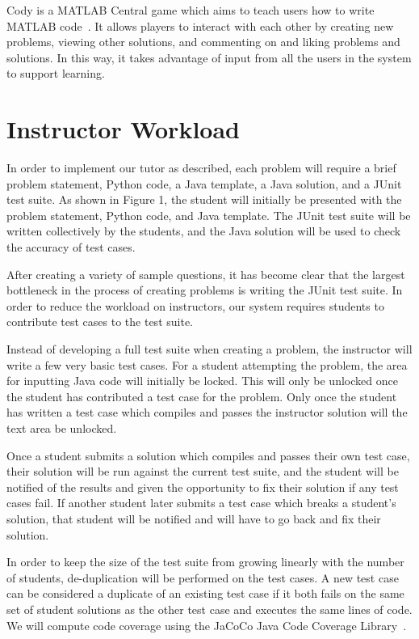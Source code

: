 \documentclass{sigchi}
\begin{document}
Cody is a MATLAB Central game which aims to teach users how to write MATLAB code~\cite{cody}.  It allows players to interact with each other by creating new problems, viewing other solutions,  and commenting on and liking problems and solutions. In this way, it takes advantage of input from all the users in the system to support learning.

\section{Instructor Workload}

In order to implement our tutor as described, each problem will require a brief problem statement, Python code, a Java template, a Java solution, and a JUnit test suite. As shown in Figure 1, the student will initially be presented with the problem statement, Python code, and Java template. The JUnit test suite will be written collectively by the students, and the Java solution will be used to check the accuracy of test cases.

After creating a variety of sample questions, it has become clear that the largest bottleneck in the process of creating problems is writing the JUnit test suite. In order to reduce the workload on instructors, our system requires students to contribute test cases to the test suite.

Instead of developing a full test suite when creating a problem, the instructor will write a few very basic test cases. For a student attempting the problem, the area for inputting Java code will initially be locked. This will only be unlocked once the student has contributed a test case for the problem. Only once the student has written a test case which compiles and passes the instructor solution will the text area be unlocked.

Once a student submits a solution which compiles and passes their own test case, their solution will be run against the current test suite, and the student will be notified of the results and given the opportunity to fix their solution if any test cases fail. If another student later submits a test case which breaks a student's solution, that student will be notified and will have to go back and fix their solution.

In order to keep the size of the test suite from growing linearly with the number of students, de-duplication will be performed on the test cases. A new test case can be considered a duplicate of an existing test case if it both fails on the same set of student solutions as the other test case and executes the same lines of code. We will compute code coverage using the JaCoCo Java Code Coverage Library~\cite{jacoco}.
\end{document}
